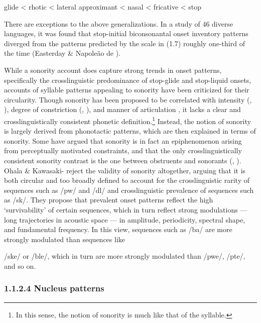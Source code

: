 \ea\label{ex:(1.7)}
  glide < rhotic < lateral approximant < nasal < fricative < stop
\z



  There are exceptions to the above generalizations. In a study of 46 diverse languages, it was found that stop-initial biconsonantal onset inventory patterns diverged from the patterns predicted by the scale in (1.7) roughly one-third of the time (Easterday \& Napoleão de \citealt{Souza2015}). 



  While a sonority account does capture strong trends in onset patterns, specifically the crosslinguistic predominance of stop-glide and stop-liquid onsets, accounts of syllable patterns appealing to sonority have been criticized for their circularity. Though sonority has been proposed to be correlated with intensity (\citealt{Gordon2002}, \citealt{Parker2002}), degree of constriction (\citealt{Chin1996}, \citealt{Cser2003}), and manner of articulation \citep{Parker2011}, it lacks a clear and crosslinguistically consistent phonetic definition.\footnote{ \textrm{In this sense, the notion of sonority is much like that of the syllable.}} Instead, the notion of sonority is largely derived from phonotactic patterns, which are then explained in terms of sonority. Some have argued that sonority is in fact an epiphenomenon arising from perceptually motivated constraints, and that the only crosslinguistically consistent sonority contrast is the one between obstruents and sonorants (\citealt{JanyEtAl2007}, \citealt{HenkeEtAl2012}). Ohala \& Kawasaki-\citet{Fukumori1997} reject the validity of sonority altogether, arguing that it is both circular and too broadly defined to account for the crosslinguistic rarity of sequences such as /pw/ and /dl/ and crosslinguistic prevalence of sequences such as /sk/. They propose that prevalent onset patterns reflect the high ‘survivability’ of certain sequences, which in turn reflect strong modulations — long trajectories in acoustic space —  in amplitude, periodicity, spectral shape, and fundamental frequency. In this view, sequences such as /ba/ are more strongly modulated than sequences like 



/ske/ or /ble/, which in turn are more strongly modulated than /pwe/, /pte/, and so on.


\subsubsection{\textbf{1.1.2.4} \textbf{Nucleus} \textbf{patterns}}

